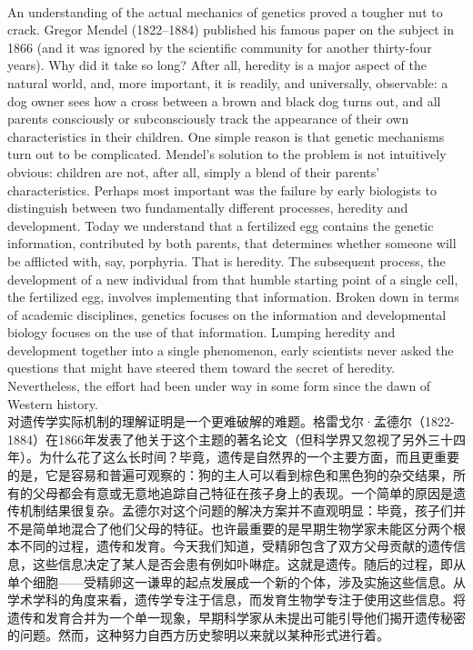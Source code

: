 \documentclass{article}
\begin{document}
\\
An understanding of the actual mechanics of genetics proved a tougher nut to crack. Gregor Mendel (1822–1884) published his famous paper on the subject in 1866 (and it was ignored by the scientific community for another thirty-four years). Why did it take so long? After all, heredity is a major aspect of the natural world, and, more important, it is readily, and universally, observable: a dog owner sees how a cross between a brown and black dog turns out, and all parents consciously or subconsciously track the appearance of their own characteristics in their children. One simple reason is that genetic mechanisms turn out to be complicated. Mendel’s solution to the problem is not intuitively obvious: children are not, after all, simply a blend of their parents’ characteristics. Perhaps most important was the failure by early biologists to distinguish between two fundamentally different processes, heredity and development. Today we understand that a fertilized egg contains the genetic information, contributed by both parents, that determines whether someone will be afflicted with, say, porphyria. That is heredity. The subsequent process, the development of a new individual from that humble starting point of a single cell, the fertilized egg, involves implementing that information. Broken down in terms of academic disciplines, genetics focuses on the information and developmental biology focuses on the use of that information. Lumping heredity and development together into a single phenomenon, early scientists never asked the questions that might have steered them toward the secret of heredity. Nevertheless, the effort had been under way in some form since the dawn of Western history.\\
对遗传学实际机制的理解证明是一个更难破解的难题。格雷戈尔·孟德尔（1822-1884）在1866年发表了他关于这个主题的著名论文（但科学界又忽视了另外三十四年）。为什么花了这么长时间？毕竟，遗传是自然界的一个主要方面，而且更重要的是，它是容易和普遍可观察的：狗的主人可以看到棕色和黑色狗的杂交结果，所有的父母都会有意或无意地追踪自己特征在孩子身上的表现。一个简单的原因是遗传机制结果很复杂。孟德尔对这个问题的解决方案并不直观明显：毕竟，孩子们并不是简单地混合了他们父母的特征。也许最重要的是早期生物学家未能区分两个根本不同的过程，遗传和发育。今天我们知道，受精卵包含了双方父母贡献的遗传信息，这些信息决定了某人是否会患有例如卟啉症。这就是遗传。随后的过程，即从单个细胞——受精卵这一谦卑的起点发展成一个新的个体，涉及实施这些信息。从学术学科的角度来看，遗传学专注于信息，而发育生物学专注于使用这些信息。将遗传和发育合并为一个单一现象，早期科学家从未提出可能引导他们揭开遗传秘密的问题。然而，这种努力自西方历史黎明以来就以某种形式进行着。\\
\end{document}
